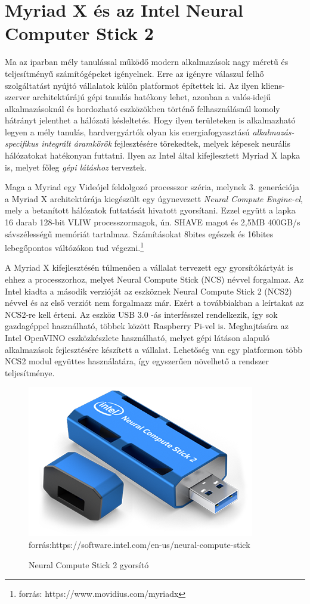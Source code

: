 \section{Myriad X és az Intel Neural Computer Stick 2}
Ma az iparban mély tanulással működő modern alkalmazások nagy méretű és teljesítményű számítógépeket igényelnek. Erre az igényre válaszul felhő szolgáltatást nyújtó vállalatok külön platformot építettek ki. Az ilyen kliens-szerver architektúrájú gépi tanulás hatékony lehet, azonban a valós-idejű alkalmazásoknál és hordozható eszközökben történő felhasználásnál komoly hátrányt jelenthet a hálózati késleltetés. Hogy ilyen területeken is alkalmazható legyen a mély tanulás, hardvergyártók olyan kis energiafogyasztású \emph{alkalmazás-specifikus integrált áramkörök} fejlesztésére törekedtek, melyek képesek neurális hálózatokat hatékonyan futtatni. Ilyen az Intel által kifejlesztett Myriad X lapka is, melyet főleg \emph{gépi látáshoz} terveztek.

Maga a Myriad egy Videójel feldolgozó processzor széria, melynek 3. generációja a Myriad X architektúrája kiegészült egy úgynevezett \emph{Neural Compute Engine-el}, mely a betanított hálózatok futtatását hivatott gyorsítani. Ezzel együtt a lapka 16 darab 128-bit VLIW processzormagok, ún. SHAVE magot és 2,5MB 400GB/s sávszélességű memóriát tartalmaz. Számításokat 8bites egészek és 16bites lebegőpontos váltózókon tud végezni.\footnote{forrás: https://www.movidius.com/myriadx} 

A Myriad X kifejlesztésén túlmenően a vállalat tervezett egy gyorsítókártyát is ehhez a processzorhoz, melyet Neural Compute Stick (NCS) névvel forgalmaz. Az Intel kiadta a második verzióját az eszköznek  Neural Compute Stick 2 (NCS2) névvel és az első verziót nem forgalmazz már. Ezért a továbbiakban a leírtakat az NCS2-re kell érteni.
Az eszköz USB 3.0 -ás interfésszel rendelkezik, így sok gazdagéppel használható, többek között Raspberry Pi-vel is. Meghajtására az Intel OpenVINO eszközkészlete használható, melyet gépi látáson alapuló alkalmazások fejlesztésére készített a vállalat. Lehetőség van egy platformon több NCS2 modul együttes használatára, így egyszerűen növelhető a rendszer teljesítménye.
\begin{figure}[h]
	\centering
	\includegraphics[width=0.5\linewidth]{fig/NCS2-specs}\\
	\footnotesize forrás:https://software.intel.com/en-us/neural-compute-stick
	\caption{Neural Compute Stick 2 gyorsító} 
	\label{fig:ncs2-specs}
\end{figure}

